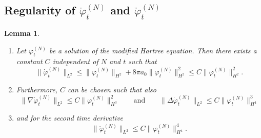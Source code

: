 \documentclass[11pt,a4paper]{scrartcl}
\newtheorem{lem}[thm]{Lemma}
\newcommand{\norm}[1]{\lVert#1\rVert}	%
\newcommand{\ph}{\varphi_t^{(N)}}	%
\newcommand{\phdot}{\dot{\varphi}_t^{(N)}}	%
\newcommand{\phddot}{\ddot{\varphi}_t^{(N)}}	%
\newcommand{\bd}{\begin{displaymath}}			%
\newcommand{\ed}{\end{displaymath}}
\begin{document}
\subsection{Regularity of $\phdot$ and $\phddot$}
\begin{lem}
\label{lm:phdotregularity}
\begin{enumerate}
 \item Let $\ph$ be a solution of the modified Hartree equation. Then there exists a constant $C$ independent of $N$ and $t$ such that
 \bd
\norm{\phdot}_{L^2} \leq \norm{\ph}_{H^2} + 8\pi a_0 \norm{\ph}_{H^2}^2 \leq C \norm{\ph}_{H^2}^2.
\ed
\item Furthermore, $C$ can be chosen such that also
\bd
\norm{\nabla \phdot}_{L^2} \leq C \norm{\ph}_{H^3}^2 \qquad \mbox{and} \qquad
\norm{\Delta \phdot}_{L^2} \leq C \norm{\ph}_{H^4}^3
\ed
\item
and for the second time derivative
\bd
\norm{\phddot}_{L^2} \leq C \norm{\ph}_{H^4}^4.
\ed
\end{enumerate}
\end{lem}
\end{document}
